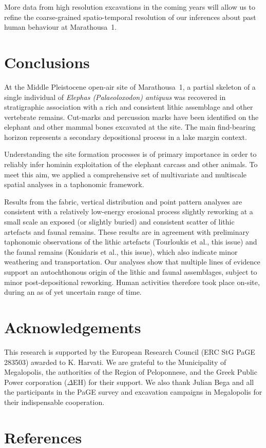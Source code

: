 \documentclass[preprint,authoryear,times]{elsarticle} %
\begin{document}
More data from high resolution excavations in the coming years will allow us to refine the coarse-grained spatio-temporal resolution of our inferences about past human behaviour at Marathousa~1.

\section{Conclusions}

At the Middle Pleistocene open-air site of Marathousa~1, a partial skeleton of a single individual of \emph{Elephas (Palaeoloxodon) antiquus} was recovered in stratigraphic association with a rich and consistent lithic assemblage and other vertebrate remains. Cut-marks and percussion marks have been identified on the elephant and other mammal bones excavated at the site. The main find-bearing horizon represents a secondary depositional process in a lake margin context.

Understanding the site formation processes is of primary importance in order to reliably infer hominin exploitation of the elephant carcass and other animals. To meet this aim, we applied a comprehensive set of multivariate and multiscale spatial analyses in a taphonomic framework.

Results from the fabric, vertical distribution and point pattern analyses are consistent with a relatively low-energy erosional process slightly reworking at a small scale an exposed (or slightly buried) and consistent scatter of lithic artefacts and faunal remains. These results are in agreement with preliminary taphonomic observations of the lithic artefacts (Tourloukis et al., this issue) and the faunal remains (Konidaris et al., this issue), which also indicate minor weathering and transportation. Our analyses show that multiple lines of evidence support an autochthonous origin of the lithic and faunal assemblages, subject to minor post-depositional reworking. Human activities therefore took place on-site, during an as of yet uncertain range of time.

\section*{Acknowledgements}

This research is supported by the European Research Council (ERC StG PaGE 283503) awarded to K. Harvati. We are grateful to the Municipality of Megalopolis, the authorities of the Region of Peloponnese, and the Greek Public Power corporation ($\Delta$EH) for their support. We also thank Julian Bega and all the participants in the PaGE survey and excavation campaigns in Megalopolis for their indispensable cooperation. %
 
\section*{References}



\end{document}
